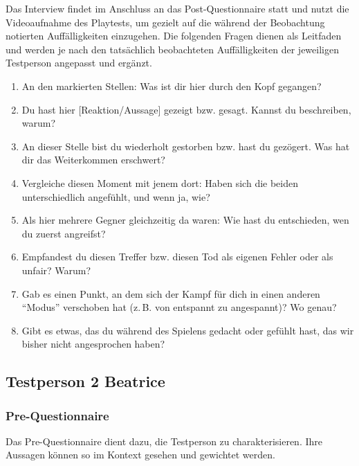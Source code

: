 \documentclass[../Main.tex]{subfiles}
\begin{document}
Das Interview findet im Anschluss an das Post-Questionnaire statt und nutzt die Videoaufnahme des Playtests, um gezielt auf die während der Beobachtung notierten Auffälligkeiten einzugehen. Die folgenden Fragen dienen als Leitfaden und werden je nach den tatsächlich beobachteten Auffälligkeiten der jeweiligen Testperson angepasst und ergänzt.
 
\begin{enumerate}[label=\textbf{I\arabic*}, leftmargin=1.5cm, itemsep=0.5em]
    \item An den markierten Stellen: Was ist dir hier durch den Kopf gegangen?
    \item Du hast hier [Reaktion/Aussage] gezeigt bzw. gesagt. Kannst du beschreiben, warum?
    \item An dieser Stelle bist du wiederholt gestorben bzw. hast du gezögert. Was hat dir das Weiterkommen erschwert?
    \item Vergleiche diesen Moment mit jenem dort: Haben sich die beiden unterschiedlich angefühlt, und wenn ja, wie?
    \item Als hier mehrere Gegner gleichzeitig da waren: Wie hast du entschieden, wen du zuerst angreifst?
    \item Empfandest du diesen Treffer bzw. diesen Tod als eigenen Fehler oder als unfair? Warum?
    \item Gab es einen Punkt, an dem sich der Kampf für dich in einen anderen \enquote{Modus} verschoben hat (z.\,B. von entspannt zu angespannt)? Wo genau?
    \item Gibt es etwas, das du während des Spielens gedacht oder gefühlt hast, das wir bisher nicht angesprochen haben?
\end{enumerate}

\subsection{Testperson 2 Beatrice}

\subsubsection{Pre-Questionnaire}

Das Pre-Questionnaire dient dazu, die Testperson zu charakterisieren. Ihre Aussagen können so im Kontext gesehen und gewichtet werden.
\end{document}
